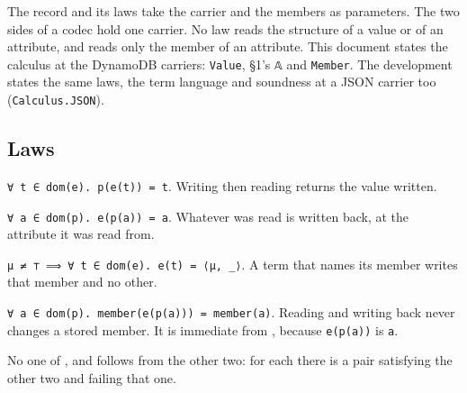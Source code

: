 The record and its laws take the carrier and the members as parameters. The two sides of a
codec hold one carrier. No law reads the structure of a value or of an attribute, and  reads only the
member of an attribute. This document states the calculus at the DynamoDB carriers: \texttt{Value},
§1's \texttt{𝔸} and \texttt{Member}. The development states the same laws, the term language and
soundness at a JSON carrier too (\texttt{Calculus.JSON}).

\subsection{Laws}\label{laws}

\begin{definition}[(R) retraction]
\label{cond:R}
\leanok
\texttt{∀\ t\ ∈\ dom(e).\ p(e(t))\ =\ t}. Writing then reading returns the value written.
\end{definition}

\begin{definition}
\label{cond:C}
\leanok
\texttt{∀\ a\ ∈\ dom(p).\ e(p(a))\ =\ a}. Whatever was read is written back, at the attribute it was
read from.
\end{definition}

\begin{definition}
\label{cond:W}
\leanok
\texttt{μ\ ≠\ ⊤\ ⟹\ ∀\ t\ ∈\ dom(e).\ e(t)\ =\ ⟨μ,\ \_⟩}. A term that names its member writes that member
and no other.
\end{definition}

\begin{corollary}
\label{cond:MP}
\leanok
\texttt{∀\ a\ ∈\ dom(p).\ member(e(p(a)))\ =\ member(a)}. Reading and writing back never changes a stored
member. It is immediate from , because \texttt{e(p(a))} is \texttt{a}.
\end{corollary}

\begin{theorem}
\label{thm:laws-independent}
\leanok
No one of ,  and  follows from the other two: for each
there is a pair satisfying the other two and failing that one.
\end{theorem}

